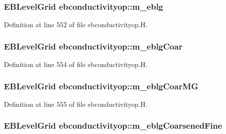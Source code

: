\subsubsection[{\texorpdfstring{m\+\_\+eblg}{m_eblg}}]{\setlength{\rightskip}{0pt plus 5cm}E\+B\+Level\+Grid ebconductivityop\+::m\+\_\+eblg\hspace{0.3cm}{\ttfamily [protected]}}\hypertarget{classebconductivityop_ad1cd04d880045c43c93028e3139fea90}{}\label{classebconductivityop_ad1cd04d880045c43c93028e3139fea90}


Definition at line 552 of file ebconductivityop.\+H.

\subsubsection[{\texorpdfstring{m\+\_\+eblg\+Coar}{m_eblgCoar}}]{\setlength{\rightskip}{0pt plus 5cm}E\+B\+Level\+Grid ebconductivityop\+::m\+\_\+eblg\+Coar\hspace{0.3cm}{\ttfamily [protected]}}\hypertarget{classebconductivityop_a889c0e41afa7f3802d726ff46a3d22aa}{}\label{classebconductivityop_a889c0e41afa7f3802d726ff46a3d22aa}


Definition at line 554 of file ebconductivityop.\+H.

\subsubsection[{\texorpdfstring{m\+\_\+eblg\+Coar\+MG}{m_eblgCoarMG}}]{\setlength{\rightskip}{0pt plus 5cm}E\+B\+Level\+Grid ebconductivityop\+::m\+\_\+eblg\+Coar\+MG\hspace{0.3cm}{\ttfamily [protected]}}\hypertarget{classebconductivityop_a8fb944d5a01d3d3cb3ea7e58cb460219}{}\label{classebconductivityop_a8fb944d5a01d3d3cb3ea7e58cb460219}


Definition at line 555 of file ebconductivityop.\+H.

\subsubsection[{\texorpdfstring{m\+\_\+eblg\+Coarsened\+Fine}{m_eblgCoarsenedFine}}]{\setlength{\rightskip}{0pt plus 5cm}E\+B\+Level\+Grid ebconductivityop\+::m\+\_\+eblg\+Coarsened\+Fine\hspace{0.3cm}{\ttfamily [protected]}}\hypertarget{classebconductivityop_a812449748a34dd673848fffc4f86041f}{}\label{classebconductivityop_a812449748a34dd673848fffc4f86041f}



